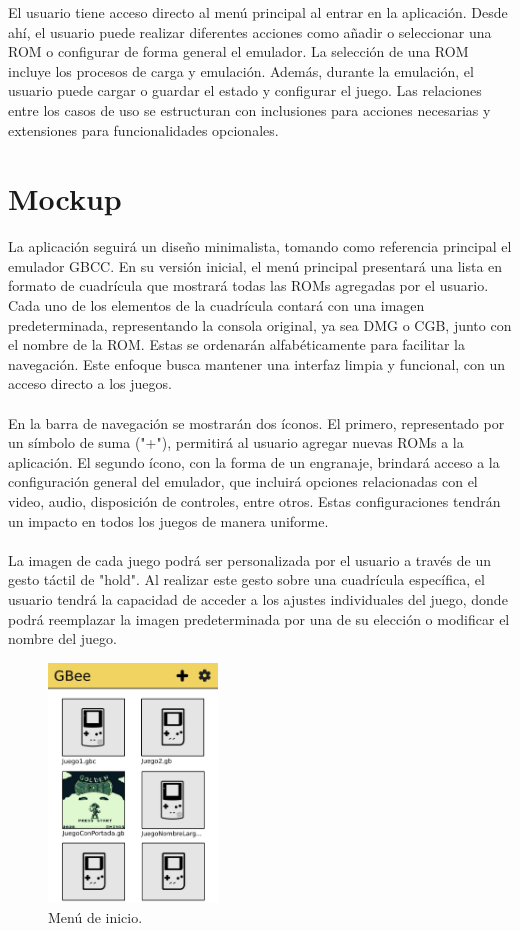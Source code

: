 El usuario tiene acceso directo al menú principal al entrar en la aplicación. Desde ahí, el usuario puede realizar diferentes acciones como añadir o seleccionar una ROM o configurar de forma general el emulador. La selección de una ROM incluye los procesos de carga y emulación. Además, durante la emulación, el usuario puede cargar o guardar el estado y configurar el juego. Las relaciones entre los casos de uso se estructuran con inclusiones para acciones necesarias y extensiones para funcionalidades opcionales.

\section{Mockup}

La aplicación seguirá un diseño minimalista, tomando como referencia principal el emulador GBCC. En su versión inicial, el menú principal presentará una lista en formato de cuadrícula que mostrará todas las ROMs agregadas por el usuario. Cada uno de los elementos de la cuadrícula contará con una imagen predeterminada, representando la consola original, ya sea DMG o CGB, junto con el nombre de la ROM. Estas se ordenarán alfabéticamente para facilitar la navegación. Este enfoque busca mantener una interfaz limpia y funcional, con un acceso directo a los juegos.
\\\\
En la barra de navegación se mostrarán dos íconos. El primero, representado por un símbolo de suma ("+"), permitirá al usuario agregar nuevas ROMs a la aplicación. El segundo ícono, con la forma de un engranaje, brindará acceso a la configuración general del emulador, que incluirá opciones relacionadas con el video, audio, disposición de controles, entre otros. Estas configuraciones tendrán un impacto en todos los juegos de manera uniforme.
\\\\
La imagen de cada juego podrá ser personalizada por el usuario a través de un gesto táctil de "hold". Al realizar este gesto sobre una cuadrícula específica, el usuario tendrá la capacidad de acceder a los ajustes individuales del juego, donde podrá reemplazar la imagen predeterminada por una de su elección o modificar el nombre del juego.

\begin{figure}[h]
    \centering
    \includegraphics[width=0.4\textwidth]{include/images/mockup_menu.jpg}
    \caption{Menú de inicio.}
    \label{figure:mockupmenu}
\end{figure}

